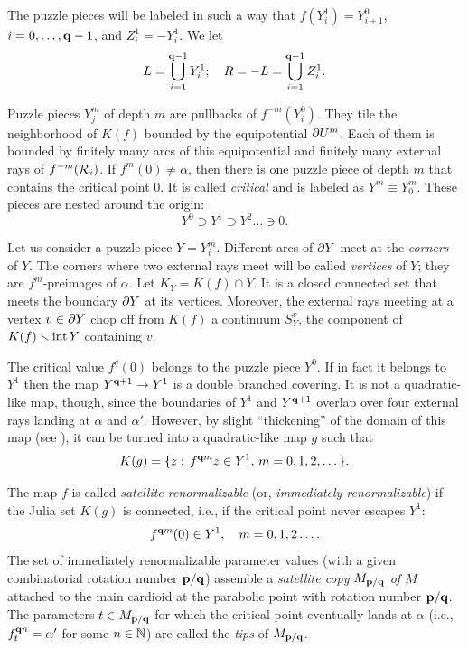 The puzzle pieces will be labeled in such a way that $f(Y_i^1) =  Y^0_{i+1}$,
$i=0,\dots, {\mathbf{q}}-1$, and $Z^1_i= - Y^1_i$.
We let
$$
   L= \bigcup_{i=1}^{{\mathbf{q}}-1} Y_i^1; \quad  R= -L= \bigcup_{i=1}^{{\mathbf{q}}-1} Z_i^1.
$$

Puzzle pieces $Y^m_j$ of depth $m$ are pullbacks of $f^{-m}(Y^0_i)$.
They tile the neighborhood of $K(f)$ bounded by the equipotential $\partial U^m $.
Each of them is bounded by finitely many arcs of this equipotential and finitely many
external rays of $f^{-m}({\mathcal R}_i)$.
If $f^m(0)\not=\alpha$, then  there is one puzzle piece of depth $m$ that contains the critical point $0$.
It is called {\it critical} and is labeled as $Y^m\equiv Y^m_0$.
These pieces are nested around the origin:
$$
   Y^0\supset Y^1\supset Y^2 \dots \ni 0.
$$

Let us consider a puzzle piece $Y=Y^m_i$.
Different arcs of $\partial Y$  meet at the {\it corners} of $Y$.
The corners where two external rays meet will be called {\it vertices} of $Y$;
they are $f^m$-preimages of $\alpha$.
Let $K_Y= K(f)\cap Y$. It is a closed connected set that meets the boundary $\partial Y$
at its  vertices. Moreover, the external rays meeting at a vertex $v\in \partial Y$ chop off from
$K(f)$ a continuum $S_Y^v$, the component of $K(f)\smallsetminus \operatorname{int} Y$ containing $v$.

The critical value $f^q(0)$ belongs to the puzzle piece $Y^0$.
If in fact it belongs to $Y^1$ then the map $Y^{{\mathbf{q}}+1}\rightarrow Y^1$ is a double branched covering.
It is not a quadratic-like map, though, since the boundaries of $Y^1$ and $Y^{{\mathbf{q}}+1}$ overlap over four external rays
landing at $\alpha$ and $\alpha'$. However,  by slight ``thickening'' of the domain of this map (see \cite{M}),
it can be turned into a quadratic-like map $g$ such that
$$
     K(g) = \{ z:\, f^{{\mathbf{q}} m}z\in Y^1, \, m=0,1,2,\dots \}.
$$

  The map $f$ is called   {\it satellite renormalizable}
(or, {\it immediately renormalizable})  if  the Julia set $K(g)$ is connected, i.e.,
if the critical point never escapes $Y^1$:
 $$
           f^{{\mathbf{q}} m}(0)\in Y^1,\quad  m = 0,1,2\dots.
$$
The set of immediately renormalizable parameter values (with a given combinatorial rotation number ${\mathbf{p}}/{\mathbf{q}}$)
assemble a {\it satellite copy $M_{{\mathbf{p}}/{\mathbf{q}}}$ of $M$} attached to the main cardioid at the parabolic point with rotation
number ${\mathbf{p}}/{\mathbf{q}}$.  The parameters $t\in M_{{\mathbf{p}}/{\mathbf{q}}}$ for which the critical point eventually lands at $\alpha$
(i.e., $f_t^{{\mathbf{q}} n} = \alpha'$ for some $n\in {\Bbb N}$) are called the {\it tips} of $M_{{\mathbf{p}}/{\mathbf{q}}}$.


